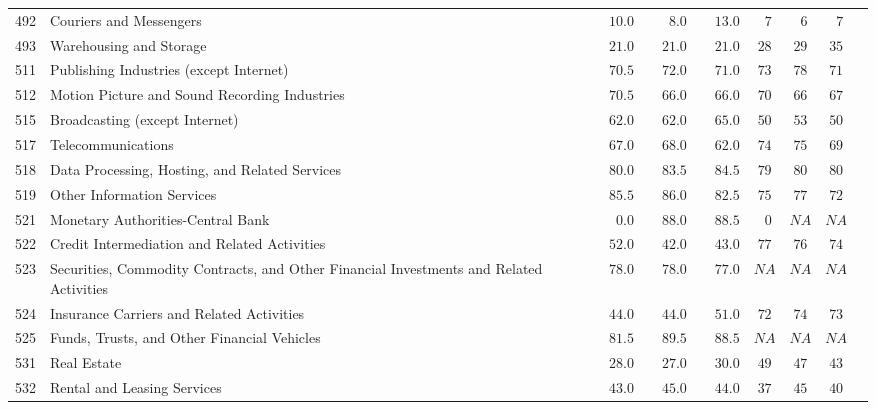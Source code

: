 \documentclass[9pt, oneside]{article}   	%
\begin{document}
\begin{longtable}{lp{3 in}ccccccc}
492  & Couriers and Messengers & $\phantom{00}10.0$ & $\phantom{000}8.0$ & $\phantom{00}13.0$ & $\phantom{0}7$ & $\phantom{0}6$ & $\phantom{0}7$ \\
493  & Warehousing and Storage & $\phantom{00}21.0$ & $\phantom{00}21.0$ & $\phantom{00}21.0$ & $28$ & $29$ & $35$ \\
511  & Publishing Industries (except Internet) & $\phantom{00}70.5$ & $\phantom{00}72.0$ & $\phantom{00}71.0$ & $73$ & $78$ & $71$ \\
512  & Motion Picture and Sound Recording Industries & $\phantom{00}70.5$ & $\phantom{00}66.0$ & $\phantom{00}66.0$ & $70$ & $66$ & $67$ \\
515  & Broadcasting (except Internet) & $\phantom{00}62.0$ & $\phantom{00}62.0$ & $\phantom{00}65.0$ & $50$ & $53$ & $50$ \\
517  & Telecommunications & $\phantom{00}67.0$ & $\phantom{00}68.0$ & $\phantom{00}62.0$ & $74$ & $75$ & $69$ \\
518  & Data Processing, Hosting, and Related Services & $\phantom{00}80.0$ & $\phantom{00}83.5$ & $\phantom{00}84.5$ & $79$ & $80$ & $80$ \\
519  & Other Information Services & $\phantom{00}85.5$ & $\phantom{00}86.0$ & $\phantom{00}82.5$ & $75$ & $77$ & $72$ \\
521  & Monetary Authorities-Central Bank & $\phantom{000}0.0$ & $\phantom{00}88.0$ & $\phantom{00}88.5$ & $\phantom{0}0$ & $NA$ & $NA$ \\
522  & Credit Intermediation and Related Activities & $\phantom{00}52.0$ & $\phantom{00}42.0$ & $\phantom{00}43.0$ & $77$ & $76$ & $74$ \\
523  & Securities, Commodity Contracts, and Other Financial Investments and Related Activities & $\phantom{00}78.0$ & $\phantom{00}78.0$ & $\phantom{00}77.0$ & $NA$ & $NA$ & $NA$ \\
524  & Insurance Carriers and Related Activities & $\phantom{00}44.0$ & $\phantom{00}44.0$ & $\phantom{00}51.0$ & $72$ & $74$ & $73$ \\
525  & Funds, Trusts, and Other Financial Vehicles & $\phantom{00}81.5$ & $\phantom{00}89.5$ & $\phantom{00}88.5$ & $NA$ & $NA$ & $NA$ \\
531  & Real Estate & $\phantom{00}28.0$ & $\phantom{00}27.0$ & $\phantom{00}30.0$ & $49$ & $47$ & $43$ \\
532  & Rental and Leasing Services & $\phantom{00}43.0$ & $\phantom{00}45.0$ & $\phantom{00}44.0$ & $37$ & $45$ & $40$ \\

\end{longtable}
\end{document}
